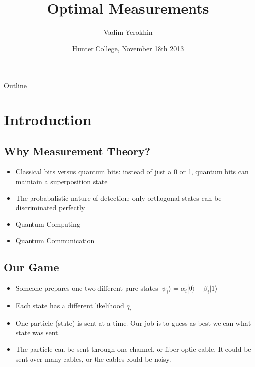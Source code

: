 \documentclass{beamer}
\title
{Optimal Measurements}
\author[Vadim Yerokhin] %
{Vadim Yerokhin }
\date[CFP 2003] %
{Hunter College, November 18th 2013 }
\newcommand{\ke}[1]{|#1\rangle}
\begin{document}
\begin{frame}
  \titlepage
\end{frame}

\begin{frame}{Outline}
  \tableofcontents[pausesections]
\end{frame}






\section{Introduction}
\subsection{Why Measurement Theory?}
\begin{frame}
\begin{itemize}
\item
Classical bits versus quantum bits: instead of just a 0 or 1, quantum bits can maintain a superposition state
\pause
\item
The probabalistic nature of detection: only orthogonal states can be discriminated perfectly
\pause
\item
Quantum Computing
\pause
\item
Quantum Communication
\end{itemize}
\end{frame}
\subsection{Our Game}
\begin{frame}
\begin{itemize}
\item
Someone prepares one two different pure states $\ke {\psi_i} = \alpha_i \ke 0 +  \beta_i \ke 1$
\pause
\item
Each state has a different likelihood $\eta_i$
\pause
\item
One particle (state) is sent at a time.  Our job is to guess as best we can what state was sent.
\pause
\item
The particle can be sent through one channel, or fiber optic cable.  It could be sent over many cables, or the cables could be noisy.
\end{itemize}

\end{frame}
\end{document}
